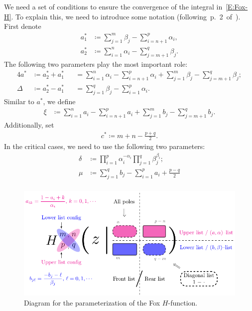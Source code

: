 \documentclass[11pt]{article}
\begin{document}
We need a set of conditions to ensure the convergence of the integral
in~\eqref{E:Fox-H}. To explain this, we need to introduce some notation
(following~p.~2~of~\cite{kilbas.saigo:04:h-transforms}). First denote
\begin{align*}
  a_1^* & \coloneqq \sum_{j=1}^{m}\beta_j  - \sum_{i=n+1}^{p}\alpha_i, \\
  a_2^* & \coloneqq \sum_{i=1}^{n}\alpha_i - \sum_{j=m+1}^{q}\beta_j .
\end{align*}
The following two parameters play the most important role:
\begin{alignat*}{4}
  a^*    & \coloneqq a^*_2 + a^*_1 &  & =  \sum_{i=1}^n \alpha_i -\sum_{i=n+1}^p \alpha_i + \sum_{j=1}^m \beta_j - \sum_{j=m+1}^{q}\beta_j; \\
  \Delta & \coloneqq a^*_2 - a^*_1 &  & = \sum_{j=1}^q\beta_j-\sum_{i=1}^p\alpha_i.
\end{alignat*}
Similar to $a^*$, we define
\begin{align*}
  \xi & \coloneqq \sum_{i=1}^n a_i -\sum_{i=n+1}^p a_i + \sum_{j=1}^m b_j - \sum_{j=m+1}^{q} b_j.
\end{align*}
Additionally, set
\begin{align*}
  c^* \coloneqq m+n - \frac{p+q}{2}.
\end{align*}
In the critical cases, we need to use the following two parameters:
\begin{align*}
  \delta & \coloneqq \prod_{i=1}^{p}\alpha_i^{-\alpha_i} \prod_{j=1}^{q}\beta_j^{\beta_i}; \\
  \mu    & \coloneqq \sum_{j=1}^{q}b_j - \sum_{i=1}^{p}a_i + \frac{p-q}{2}                 \\
\end{align*}

\begin{figure}[htp]
  \centering
  \includegraphics[width=1.0\textwidth]{./FoxH-Diagram.pdf}
  \caption{Diagram for the parameterization of the Fox $H$-function.}
  \label{F:Diagram}
\end{figure}
\end{document}
